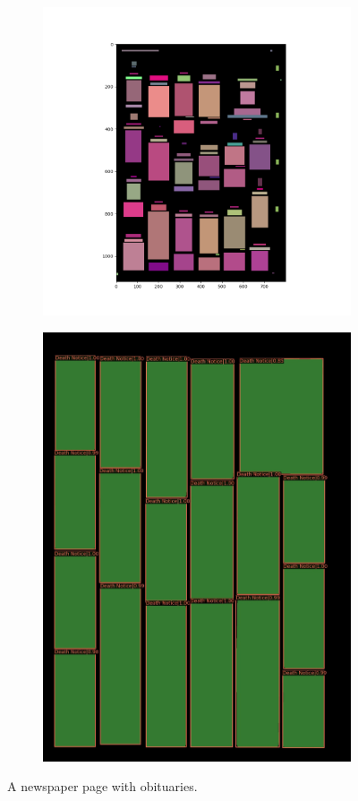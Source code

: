 \documentclass[aspectratio=1610]{beamer}
\begin{document}
\begin{frame}
  \begin{figure}
\centering
\begin{subfigure}{.5\textwidth}
  \centering
  \includegraphics[width=0.7\linewidth, clip=true, trim = 50mm 20mm 60mm 0mm]{figures/tf/GQU6vjW.png}
\end{subfigure}%
\begin{subfigure}{.5\textwidth}
  \centering
  \includegraphics[width=0.7\linewidth, clip=true, trim = 0mm 0mm 0mm 0mm]{figures/labels-vanilla-0.75/GQU6vjW.jpg}
\end{subfigure}
\caption{A newspaper page with obituaries.}
\label{fig:obituaries}
\end{figure}
\end{frame}
\normalpage
\end{document}

